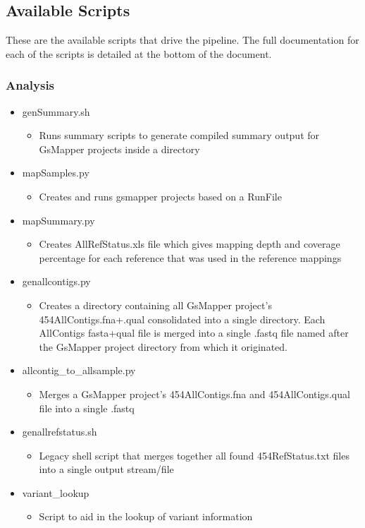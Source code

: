 \documentclass{article}
\begin{document}
\subsection{Available Scripts}
These are the available scripts that drive the pipeline.
The full documentation for each of the scripts is detailed at the bottom of the document.
\subsubsection{Analysis}
 \begin{itemize}
 \item genSummary.sh
  \begin{itemize}
   \item Runs summary scripts to generate compiled summary output for GsMapper projects inside a directory
  \end{itemize}
 \item mapSamples.py
  \begin{itemize}
   \item Creates and runs gsmapper projects based on a RunFile
  \end{itemize}
 \item mapSummary.py
  \begin{itemize}
   \item Creates AllRefStatus.xls file which gives mapping depth and coverage percentage for each reference that was used in the reference mappings
  \end{itemize}
 \item genallcontigs.py
  \begin{itemize}
   \item Creates a directory containing all GsMapper project's 454AllContigs.fna+.qual consolidated into a single directory. Each AllContigs fasta+qual file is merged into a single .fastq file named after the GsMapper project directory from which it originated.
   \end{itemize}
 \item allcontig\_to\_allsample.py
  \begin{itemize}
   \item Merges a GsMapper project's 454AllContigs.fna and 454AllContigs.qual file into a single .fastq
  \end{itemize}
 \item genallrefstatus.sh
  \begin{itemize}
   \item Legacy shell script that merges together all found 454RefStatus.txt files into a single output stream/file
  \end{itemize}
 \item variant\_lookup
  \begin{itemize}
   \item Script to aid in the lookup of variant information
  \end{itemize}
 \end{itemize}
\end{document}
